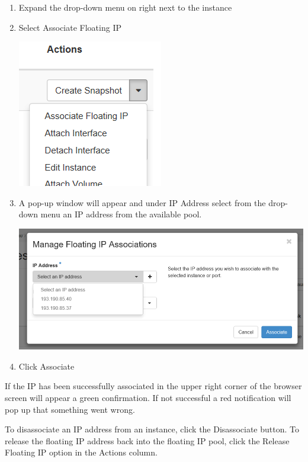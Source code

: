 \begin{enumerate}
\item Expand the drop-down menu on right next to the instance
\item Select Associate Floating IP
\begin{center}
\includegraphics[scale=0.7]{img/associate_IP_1.png}
\end{center}
\item A pop-up window will appear and under IP Address select from the
  drop-down menu an IP address from the available pool.
\begin{center}
\includegraphics[scale=0.5]{img/associate_IP_2.png}
\end{center}
\item Click Associate
\end{enumerate}

If the IP has been successfully associated in the upper right corner of the browser screen will appear a green confirmation. If not successful a red notification will pop up that something went wrong.

 To disassociate an IP address from an instance, click
the Disassociate button.  To release the floating IP address back into
the floating IP pool, click the Release Floating IP option in the
Actions column.

